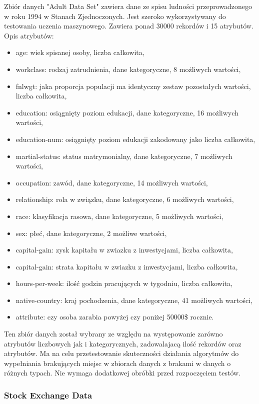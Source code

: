 \documentclass[12pt,twoside]{article}
\begin{document}
Zbiór danych "Adult Data Set" zawiera dane ze spisu ludności przeprowadzonego w roku 1994 w Stanach Zjednoczonych.
Jest szeroko wykorzystywany do testowania uczenia maszynowego.
Zawiera ponad 30000 rekordów i 15 atrybutów. \cite{adult} Opis atrybutów:
\begin{itemize}[label=-,labelsep=0.4cm, leftmargin=1.25cm]
    \item age: wiek spisanej osoby, liczba całkowita,
    \item workclass: rodzaj zatrudnienia, dane kategoryczne, 8 możliwych wartości,
    \item fnlwgt: jaka proporcja populacji ma identyczny zestaw pozostałych wartości, liczba całkowita,
    \item education: osiągnięty poziom edukacji, dane kategoryczne, 16 możliwych wartości,
    \item education-num: osiągnięty poziom edukacji zakodowany jako liczba całkowita,
    \item martial-status: status matrymonialny, dane kategoryczne, 7 możliwych wartości,
    \item occupation: zawód, dane kategoryczne, 14 możliwych wartości,
    \item relationship: rola w związku, dane kategoryczne, 6 możliwych wartości,
    \item race: klasyfikacja rasowa, dane kategoryczne, 5 możliwych wartości,
    \item sex: płeć, dane kategoryczne, 2 możliwe wartości,
    \item capital-gain: zysk kapitału w zwiazku z inwestycjami, liczba całkowita,
    \item capital-gain: strata kapitału w zwiazku z inwestycjami, liczba całkowita,
    \item hours-per-week: ilość godzin pracujących w tygodniu, liczba całkowita,
    \item native-country: kraj pochodzenia, dane kategoryczne, 41 możliwych wartości,
    \item attribute: czy osoba zarabia powyżej czy poniżej 50000\$ rocznie.
\end{itemize}
Ten zbiór danych został wybrany ze względu na występowanie zarówno atrybutów liczbowych jak i kategorycznych,
zadowalajacą ilość rekordów oraz atrybutów.
Ma na celu przetestowanie skuteczności działania algorytmów do wypełniania brakujących miejsc
w zbiorach danych z brakami w danych o różnych typach.
Nie wymaga dodatkowej obróbki przed rozpoczęciem testów. 
\subsubsection{Stock Exchange Data}
\end{document}

